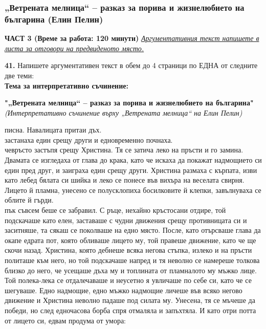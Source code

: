 \documentclass[12pt,a4paper]{article}
\begin{document}
\subsubsection{„Ветрената мелница“ – разказ за порива и жизнелюбието на българина (Елин Пелин)}
\vspace{0.5cm}
\begin{center}
\textbf{ЧАСТ 3 (Време за работа: 120 минути)}
\vspace{0.2cm}
{\textit{\underline{Аргументативния текст напишете в листа за отговори на предвиденото място.}}}
\vspace{0.1cm}
\end{center}
\textbf{41.} Напишете аргументативен текст в обем до 4 страници по ЕДНА от следните две теми:
\\
\vspace{0.2cm}
\textbf{Тема за интерпретативно съчинение:}
\vspace{0.1cm}
\begin{center}
\textbf{"„Ветрената мелница“ – разказ за порива и жизнелюбието на българина"}
\\
\textit{(Интерпретативно съчинение върху „Ветрената мелница“ на Елин Пелин)}
\end{center}
 писна. Навалицата притаи дъх.
\\
 застанаха един срещу други и едновременно почнаха.
\\
 чевръсто застъпя срещу Христина. Тя се затича леко на пръсти и го замина. Двамата се изгледаха от глава до крака, като че искаха да покажат надмощието си един пред друг, и заиграха един срещу други. Христина размаха с кърпата, изви като лебед бялата си шийка и леко се понесе във вихъра на веселата свирня. Лицето й пламна, унесено се полусклопиха босилковите й клепки, завълнуваха се облите й гърди.
\\
 пък съвсем беше се забравил. С ръце, нехайно кръстосани отдире, той подскачаше като елен, заставаше с чудни движения срещу противницата си и заситняше, та сякаш се поколваше на едно място. После, като отърсваше глава да окапе едрата пот, която обливаше лицето му, той правеше движение, като че ще скочи назад. Христина, която дебнеше всяка негова стъпка, излеко и на пръсти политаше към него, но той подскачаше напред и тя неволно се намереше толкова близко до него, че усещаше дъха му и топлината от пламналото му мъжко лице. Той полека-лека се отдалечаваше и неусетно я увличаше по себе си, като че се шегуваше. Едно надмощие, едно мъжко надмощие личеше във всяко негово движение и Христина неволно падаше под силата му. Унесена, тя се мъчеше да победи, но след едночасова борба спря отмаляла и запъхтяла. И като отри потта от лицето си, едвам продума от умора:
\end{document}
